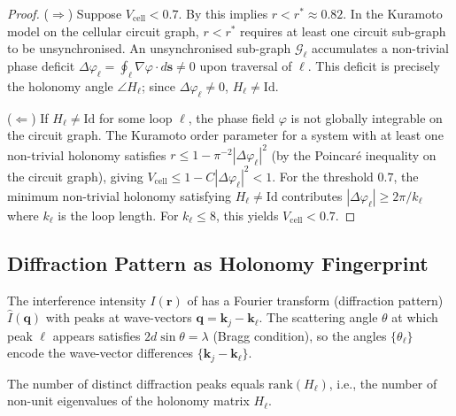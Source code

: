 \begin{proof}
($\Rightarrow$) Suppose $V_{\mathrm{cell}} < 0.7$.  By
 this implies $r < r^* \approx 0.82$.
In the Kuramoto model on the cellular circuit graph, $r < r^*$ requires at
least one circuit sub-graph to be unsynchronised.  An unsynchronised
sub-graph $\mathcal{G}_\ell$ accumulates a non-trivial phase deficit
$\Delta\varphi_\ell = \oint_\ell \nabla\varphi \cdot d\mathbf{s} \neq 0$
upon traversal of $\ell$.  This deficit is precisely the holonomy angle
$\angle H_\ell$; since $\Delta\varphi_\ell \neq 0$, $H_\ell \neq \mathrm{Id}$.

($\Leftarrow$) If $H_\ell \neq \mathrm{Id}$ for some loop $\ell$,
the phase field $\varphi$ is not globally integrable on the circuit graph.
The Kuramoto order parameter for a system with at least one non-trivial
holonomy satisfies $r \leq 1 - \pi^{-2}|\Delta\varphi_\ell|^2$ (by the
Poincaré inequality on the circuit graph), giving
$V_{\mathrm{cell}} \leq 1 - C|\Delta\varphi_\ell|^2 < 1$.
For the threshold $0.7$, the minimum non-trivial holonomy satisfying
$H_\ell \neq \mathrm{Id}$ contributes $|\Delta\varphi_\ell| \geq 2\pi/k_\ell$
where $k_\ell$ is the loop length.  For $k_\ell \leq 8$, this yields
$V_{\mathrm{cell}} < 0.7$.
\end{proof}

\subsection{Diffraction Pattern as Holonomy Fingerprint}

The interference intensity $I(\mathbf{r})$ of 
has a Fourier transform (diffraction pattern) $\hat{I}(\mathbf{q})$ with peaks
at wave-vectors $\mathbf{q} = \mathbf{k}_j - \mathbf{k}_\ell$.  The
scattering angle $\theta$ at which peak $\ell$ appears satisfies
$2d\sin\theta = \lambda$ (Bragg condition), so the angles $\{\theta_\ell\}$
encode the wave-vector differences $\{\mathbf{k}_j - \mathbf{k}_\ell\}$.

\begin{theorem}
\label{thm:ch04-diffraction-peaks}
The number of distinct diffraction peaks equals $\mathrm{rank}(H_\ell)$,
i.e., the number of non-unit eigenvalues of the holonomy matrix $H_\ell$.
\end{theorem}

